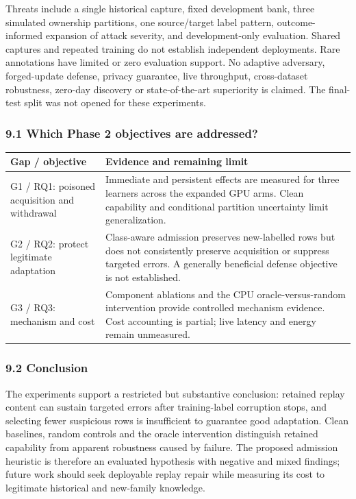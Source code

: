 \documentclass[
  10pt,
  a4paper,
]{article}
\begin{document}
Threats include a single historical capture, fixed development bank,
three simulated ownership partitions, one source/target label pattern,
outcome-informed expansion of attack severity, and development-only
evaluation. Shared captures and repeated training do not establish
independent deployments. Rare annotations have limited or zero
evaluation support. No adaptive adversary, forged-update defense,
privacy guarantee, live throughput, cross-dataset robustness, zero-day
discovery or state-of-the-art superiority is claimed. The final-test
split was not opened for these experiments.

\hypertarget{which-phase-2-objectives-are-addressed}{%
\subsubsection{9.1 Which Phase 2 objectives are
addressed?}\label{which-phase-2-objectives-are-addressed}}

\begin{longtable}[]{@{}
  >{\raggedright\arraybackslash}p{}
  >{\raggedright\arraybackslash}p{}@{}}
\toprule
Gap / objective & Evidence and remaining limit \\
\midrule
\endhead
G1 / RQ1: poisoned acquisition and withdrawal & Immediate and persistent
effects are measured for three learners across the expanded GPU arms.
Clean capability and conditional partition uncertainty limit
generalization. \\
G2 / RQ2: protect legitimate adaptation & Class-aware admission
preserves new-labelled rows but does not consistently preserve
acquisition or suppress targeted errors. A generally beneficial defense
objective is not established. \\
G3 / RQ3: mechanism and cost & Component ablations and the CPU
oracle-versus-random intervention provide controlled mechanism evidence.
Cost accounting is partial; live latency and energy remain
unmeasured. \\
\bottomrule
\end{longtable}

\hypertarget{conclusion}{%
\subsubsection{9.2 Conclusion}\label{conclusion}}

The experiments support a restricted but substantive conclusion:
retained replay content can sustain targeted errors after training-label
corruption stops, and selecting fewer suspicious rows is insufficient to
guarantee good adaptation. Clean baselines, random controls and the
oracle intervention distinguish retained capability from apparent
robustness caused by failure. The proposed admission heuristic is
therefore an evaluated hypothesis with negative and mixed findings;
future work should seek deployable replay repair while measuring its
cost to legitimate historical and new-family knowledge.
\end{document}
